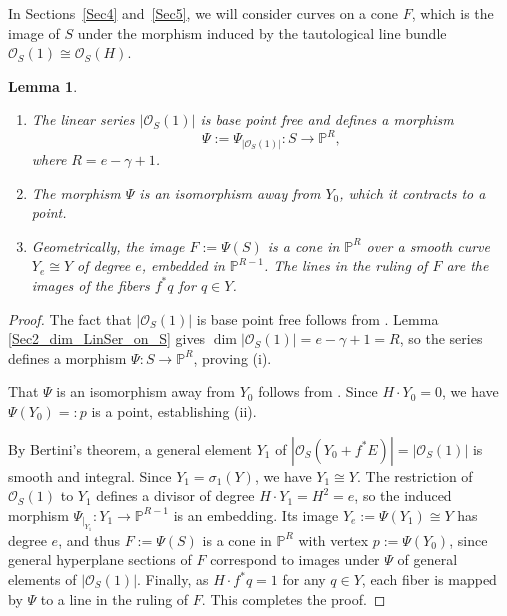 \documentclass[a4paper,12pt]{amsart}
\newtheorem{lemma}[thm]{Lemma}
\def\dim{\operatorname{dim}}
\begin{document}
In Sections~\ref{Sec4} and~\ref{Sec5}, we will consider curves on a cone $F$, which is the image of $S$ under the morphism induced by the tautological line bundle $\mathcal{O}_S (1) \cong \mathcal{O}_S (H)$.
\begin{lemma}\label{Sec2_Lemma_morphism_psi}
\begin{enumerate}[label=(\roman*), leftmargin=*, font=\rmfamily]
 \item The linear series $|\mathcal{O}_S (1)|$ is base point free and defines a morphism
\[
 \Psi := \Psi_{|\mathcal{O}_S (1)|} : S \to \mathbb{P}^R ,
\]
where $R = e-\gamma+1$.

 \item The morphism $\Psi$ is an isomorphism away from $Y_0$, which it contracts to a point.

 \item Geometrically, the image $F := \Psi (S)$ is a cone in $\mathbb{P}^R$ over a smooth curve $Y_e \cong Y$ of degree $e$, embedded in $\mathbb{P}^{R-1}$. The lines in the ruling of $F$ are the images of the fibers $f^{\ast} q$ for $q \in Y$.
\end{enumerate}
\end{lemma}
\begin{proof}
The fact that $|\mathcal{O}_S (1)|$ is base point free follows from \cite[Ex.~V.2.11, p.385]{Hart77}. Lemma \ref{Sec2_dim_LinSer_on_S} gives $\dim |\mathcal{O}_S (1)| = e-\gamma+1 = R$, so the series defines a morphism $\Psi : S \to \mathbb{P}^R$, proving \textnormal{(i)}.

That $\Psi$ is an isomorphism away from $Y_0$ follows from \cite[Proposition~23]{GP2005}. Since $H \cdot Y_0 = 0$, we have $\Psi (Y_0) =: p$ is a point, establishing \textnormal{(ii)}.

By Bertini's theorem, a general element $Y_1$ of $|\mathcal{O}_S (Y_0 + f^{\ast} E)| = |\mathcal{O}_S (1)|$ is smooth and integral. Since $Y_1 = \sigma_1 (Y)$, we have $Y_1 \cong Y$. The restriction of $\mathcal{O}_S (1)$ to $Y_1$ defines  a divisor of degree $H \cdot Y_1 = H^2 = e$, so the induced morphism  $\Psi_{|_{Y_1}} : Y_1 \to \mathbb{P}^{R-1}$ is an embedding. Its image $Y_e := \Psi (Y_1) \cong Y$ has degree $e$, and thus $F := \Psi (S)$ is a cone in $\mathbb{P}^R$ with vertex $p := \Psi (Y_0)$, since general hyperplane sections of $F$ correspond to images under $\Psi$ of general elements of $|\mathcal{O}_S (1)|$. Finally, as $H \cdot f^{\ast} q = 1$ for any $q \in Y$, each fiber is mapped by $\Psi$ to a line in the ruling of $F$. This completes the proof.
\end{proof}
\end{document}
